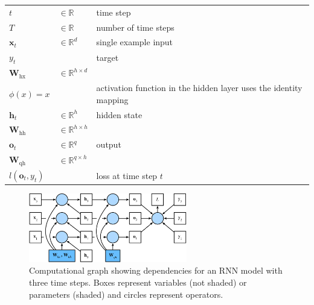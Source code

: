 \begin{customTableWrapper}{1.5}
\begin{longtable}{l l p{8cm}}
    $t$ & $\in \mathbb{R}$ & time step \\
    $T$ & $\in \mathbb{R}$ & number of time steps \\
    $\mathbf{x}_t$ & $\in \mathbb{R}^d$ & single example input \\
    $y_t$ & & target \\

    $\mathbf{W}_\textrm{hx}$ & $\in \mathbb{R}^{h \times d}$ & \\
    
    \hline
    $\phi(x)=x$ & & activation function in the hidden layer uses the identity mapping \\
    $\mathbf{h}_t$ & $\in \mathbb{R}^h$ & hidden state \\
    $\mathbf{W}_\textrm{hh}$ & $\in \mathbb{R}^{h \times h}$ & \\

    \hline
    $\mathbf{o}_t$ & $\in \mathbb{R}^q$ & output \\
    $\mathbf{W}_\textrm{qh}$ & $\in \mathbb{R}^{q \times h}$ & \\

    \hline
    $l(\mathbf{o}_t, y_t)$ & & loss at time step $t$ \\
\end{longtable}
\end{customTableWrapper}

\begin{figure}[H]
    \centering
    \includegraphics[width=\linewidth, height=3cm, keepaspectratio]{Pictures/Recurrent-Neural-Networks/rnn-bptt.jpg}
    \caption*{Computational graph showing dependencies for an RNN model with three time steps. Boxes represent variables (not shaded) or parameters (shaded) and circles represent operators.}
\end{figure}

